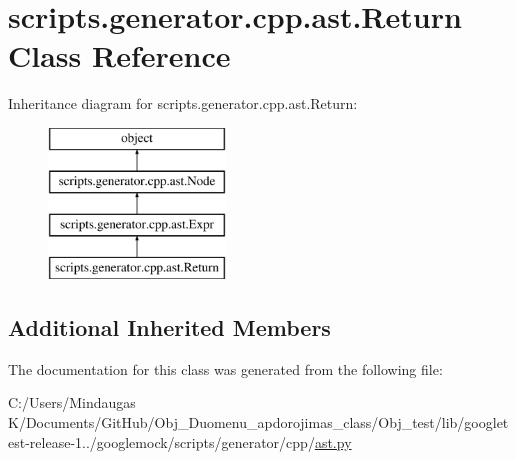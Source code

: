 \hypertarget{classscripts_1_1generator_1_1cpp_1_1ast_1_1_return}{}\section{scripts.\+generator.\+cpp.\+ast.\+Return Class Reference}
\label{classscripts_1_1generator_1_1cpp_1_1ast_1_1_return}
Inheritance diagram for scripts.\+generator.\+cpp.\+ast.\+Return\+:\begin{figure}[H]
\begin{center}
\leavevmode
\includegraphics[height=4.000000cm]{d5/d43/classscripts_1_1generator_1_1cpp_1_1ast_1_1_return}
\end{center}
\end{figure}
\subsection*{Additional Inherited Members}


The documentation for this class was generated from the following file\+:\begin{DoxyCompactItemize}
\item 
C\+:/\+Users/\+Mindaugas K/\+Documents/\+Git\+Hub/\+Obj\+\_\+\+Duomenu\+\_\+apdorojimas\+\_\+class/\+Obj\+\_\+test/lib/googletest-\/release-\/1../googlemock/scripts/generator/cpp/\mbox{\hyperlink{_obj__test_2lib_2googletest-release-1_88_81_2googlemock_2scripts_2generator_2cpp_2ast_8py}{ast.\+py}}\end{DoxyCompactItemize}
